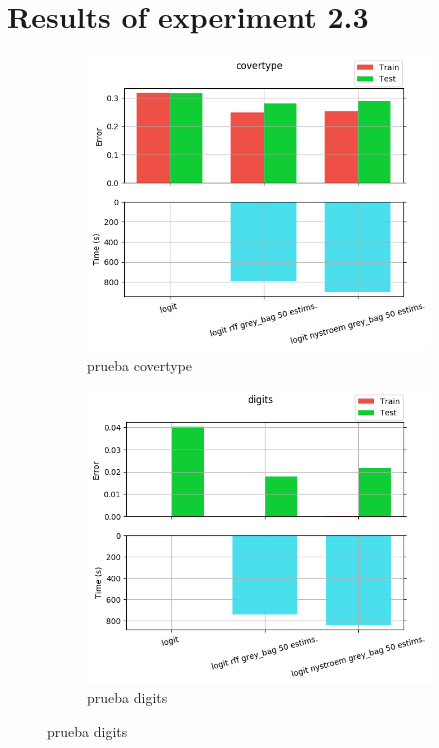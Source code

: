 
\chapter{Results of experiment 2.3} %

\label{Appendix2-3} %

\begin{figure}[ht]
  \centering
  \begin{subfigure}[b]{0.5\linewidth}
    \centering\includegraphics[width=\imgscale\linewidth]{Figures/2_3/covertype}
    \caption{prueba covertype}
    \label{fig:2_3_covertype}
  \end{subfigure}%
  \begin{subfigure}[b]{0.5\linewidth}
    \centering\includegraphics[width=\imgscale\linewidth]{Figures/2_3/digits}
    \caption{prueba digits}
    \label{fig:2_3_digits}
  \end{subfigure}
\end{figure}


